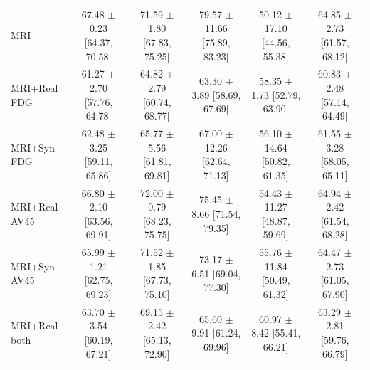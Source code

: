 \documentclass{article}
\begin{document}
\begin{landscape}
\begin{longtable}{lccccc}
MRI & \shortstack{67.48 $\pm$ 0.23\\{}[64.37, 70.58]} & \shortstack{71.59 $\pm$ 1.80\\{}[67.83, 75.25]} & \shortstack{79.57 $\pm$ 11.66\\{}[75.89, 83.23]} & \shortstack{50.12 $\pm$ 17.10\\{}[44.56, 55.38]} & \shortstack{64.85 $\pm$ 2.73\\{}[61.57, 68.12]} \\
MRI+Real FDG & \shortstack{61.27 $\pm$ 2.70\\{}[57.76, 64.78]} & \shortstack{64.82 $\pm$ 2.79\\{}[60.74, 68.77]} & \shortstack{63.30 $\pm$ 3.89\\{}[58.69, 67.69]} & \shortstack{58.35 $\pm$ 1.73\\{}[52.79, 63.90]} & \shortstack{60.83 $\pm$ 2.48\\{}[57.14, 64.49]} \\
MRI+Syn FDG & \shortstack{62.48 $\pm$ 3.25\\{}[59.11, 65.86]} & \shortstack{65.77 $\pm$ 5.56\\{}[61.81, 69.81]} & \shortstack{67.00 $\pm$ 12.26\\{}[62.64, 71.13]} & \shortstack{56.10 $\pm$ 14.64\\{}[50.82, 61.35]} & \shortstack{61.55 $\pm$ 3.28\\{}[58.05, 65.11]} \\
MRI+Real AV45 & \shortstack{66.80 $\pm$ 2.10\\{}[63.56, 69.91]} & \shortstack{72.00 $\pm$ 0.79\\{}[68.23, 75.75]} & \shortstack{75.45 $\pm$ 8.66\\{}[71.54, 79.35]} & \shortstack{54.43 $\pm$ 11.27\\{}[48.87, 59.69]} & \shortstack{64.94 $\pm$ 2.42\\{}[61.54, 68.28]} \\
MRI+Syn AV45 & \shortstack{65.99 $\pm$ 1.21\\{}[62.75, 69.23]} & \shortstack{71.52 $\pm$ 1.85\\{}[67.73, 75.10]} & \shortstack{73.17 $\pm$ 6.51\\{}[69.04, 77.30]} & \shortstack{55.76 $\pm$ 11.84\\{}[50.49, 61.32]} & \shortstack{64.47 $\pm$ 2.73\\{}[61.05, 67.90]} \\
MRI+Real both & \shortstack{63.70 $\pm$ 3.54\\{}[60.19, 67.21]} & \shortstack{69.15 $\pm$ 2.42\\{}[65.13, 72.90]} & \shortstack{65.60 $\pm$ 9.91\\{}[61.24, 69.96]} & \shortstack{60.97 $\pm$ 8.42\\{}[55.41, 66.21]} & \shortstack{63.29 $\pm$ 2.81\\{}[59.76, 66.79]} \\

\end{longtable}
\end{landscape}
\end{document}
